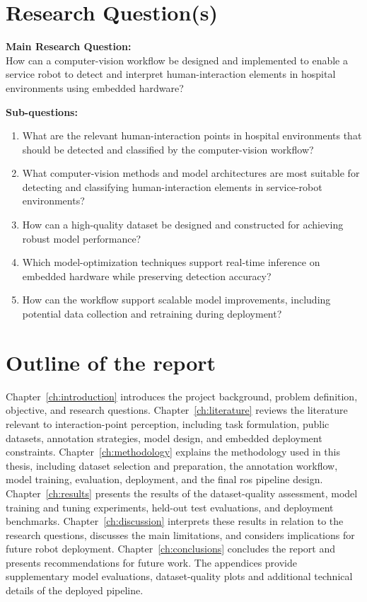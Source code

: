 \section{Research Question(s)}
\textbf{Main Research Question:} \\
How can a computer-vision workflow be designed and implemented to enable a service robot to detect and interpret human-interaction elements in hospital environments using embedded hardware?

\textbf{Sub-questions:}
\begin{enumerate}
    \item What are the relevant human-interaction points in hospital environments that should be detected and classified by the computer-vision workflow?
    \item What computer-vision methods and model architectures are most suitable for detecting and classifying human-interaction elements in service-robot environments?
    \item How can a high-quality dataset be designed and constructed for achieving robust model performance?
    \item Which model-optimization techniques support real-time inference on embedded hardware while preserving detection accuracy?
    \item How can the workflow support scalable model improvements, including potential data collection and retraining during deployment?
\end{enumerate}


\section{Outline of the report}

Chapter~\ref{ch:introduction} introduces the project background, problem
definition, objective, and research questions. Chapter~\ref{ch:literature}
reviews the literature relevant to interaction-point perception, including task
formulation, public datasets, annotation strategies, model design, and embedded
deployment constraints. Chapter~\ref{ch:methodology} explains the methodology
used in this thesis, including dataset selection and preparation, the
annotation workflow, model training, evaluation, deployment, and the final
\gls{ros} pipeline design. Chapter~\ref{ch:results} presents the results of
the dataset-quality assessment, model training and tuning experiments,
held-out test evaluations, and deployment benchmarks.
Chapter~\ref{ch:discussion} interprets these results in relation to the
research questions, discusses the main limitations, and considers implications
for future robot deployment. Chapter~\ref{ch:conclusions} concludes the report
and presents recommendations for future work. The appendices provide
supplementary model evaluations, dataset-quality plots and additional technical details of the deployed pipeline.
